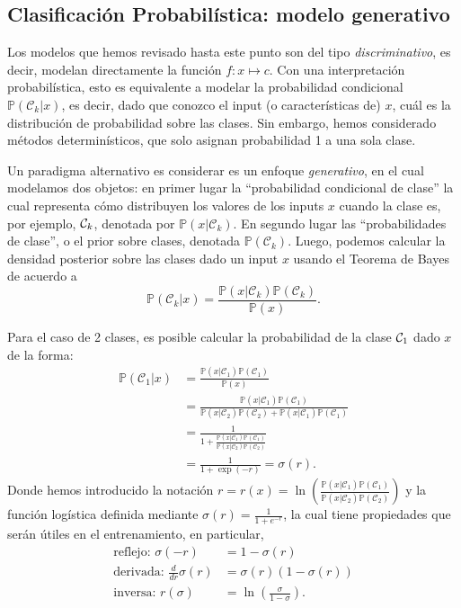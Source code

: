 \subsection{Clasificación Probabilística: modelo generativo}

Los modelos que hemos revisado hasta este punto son del tipo \emph{discriminativo}, es decir, modelan directamente la función $f:x\mapsto c$. Con una interpretación probabilística, esto es equivalente a modelar la probabilidad condicional $\mathbb{P}(\mathcal{C}_k|x)$, es decir, dado que conozco el input (o características de) $x$, cuál es la distribución de probabilidad sobre las clases. Sin embargo, hemos considerado métodos determinísticos, que solo asignan probabilidad 1 a una sola clase. 


Un paradigma alternativo es considerar es un enfoque \emph{generativo}, en el cual modelamos dos  objetos: en primer lugar la ``probabilidad condicional de clase'' la cual representa cómo distribuyen los valores de los inputs $x$ cuando la  clase es, por  ejemplo, ${\mathcal C}_k$, denotada por $\mathbb{P}(x|\mathcal{C}_k)$. En segundo lugar las ``probabilidades de clase'', o el prior sobre clases, denotada $\mathbb{P}(\mathcal{C}_k)$. Luego, podemos calcular la densidad posterior sobre las clases dado un input $x$ usando el Teorema de Bayes de acuerdo a 
\begin{equation}
	\mathbb{P}(\mathcal{C}_k|x) = \frac{\mathbb{P}(x|\mathcal{C}_k)\mathbb{P}(\mathcal{C}_k)}{\mathbb{P}(x)}.
\end{equation}

Para el caso de 2 clases, es posible calcular la probabilidad de la clase ${\mathcal C}_1$ dado $x$ de la forma:
\begin{align}
	\mathbb{P}(\mathcal{C}_1|x) &= \frac{\mathbb{P}(x|\mathcal{C}_1)\mathbb{P}(\mathcal{C}_1)}{\mathbb{P}(x)}\nonumber\\
	&= \frac{\mathbb{P}(x|\mathcal{C}_1)\mathbb{P}(\mathcal{C}_1)}{\mathbb{P}(x|\mathcal{C}_2)\mathbb{P}(\mathcal{C}_2)+\mathbb{P}(x|\mathcal{C}_1)\mathbb{P}(\mathcal{C}_1)}\nonumber\\
	&=\frac{1}{1+\frac{\mathbb{P}(x|\mathcal{C}_1)\mathbb{P}(\mathcal{C}_1)}{\mathbb{P}(x|\mathcal{C}_2)\mathbb{P}(\mathcal{C}_2)}}\nonumber\\
	&=\frac{1}{1+\exp(-r)} = \sigma(r).\label{eq:logistic1}
\end{align}
Donde hemos introducido la notación $r = r(x) =\ln\left(\frac{\mathbb{P}(x|\mathcal{C}_1)\mathbb{P}(\mathcal{C}_1)}{\mathbb{P}(x|\mathcal{C}_2)\mathbb{P}(\mathcal{C}_2)}\right)$  y la  función logística definida mediante $\sigma(r) = \frac{1}{1+e^{-r}}$, la cual  tiene propiedades que serán útiles en el entrenamiento, en particular, 
\begin{align}
	\text{reflejo: }\sigma(-r)&=1-\sigma(r)\\
	\text{derivada: }\frac{d}{dr}\sigma(r)&=\sigma(r)(1-\sigma(r))\\
	\text{inversa: }r(\sigma)&=\ln\left(\frac{\sigma}{1-\sigma}\right).
\end{align}


